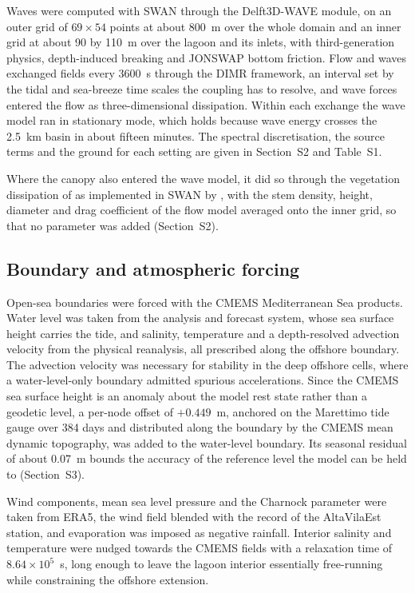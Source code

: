 Waves were computed with SWAN \citep{Booij1999} through the Delft3D-WAVE
module, on an outer grid of $69 \times 54$ points at about 800~m over the whole
domain and an inner grid at about 90 by 110~m over the lagoon and its inlets,
with third-generation physics, depth-induced breaking \citep{BattjesJanssen1978}
and JONSWAP bottom friction. Flow and waves exchanged fields every 3600~s
through the DIMR framework, an interval set by the tidal and sea-breeze time
scales the coupling has to resolve, and wave forces entered the flow as
three-dimensional dissipation. Within each exchange the wave model ran in
stationary mode, which holds because wave energy crosses the 2.5~km basin in
about fifteen minutes. The spectral discretisation, the source terms and the
ground for each setting are given in Section~S2 and Table~S1.

Where the canopy also entered the wave model, it did so through the vegetation
dissipation of \citet{Dalrymple1984} as implemented in SWAN by
\citet{Suzuki2012}, with the stem density, height, diameter and drag coefficient
of the flow model averaged onto the inner grid, so that no parameter was added
(Section~S2).

\subsection{Boundary and atmospheric forcing}
\label{sec:methods_forcing}

Open-sea boundaries were forced with the CMEMS Mediterranean Sea products.
Water level was taken from the analysis and forecast system, whose sea surface
height carries the tide, and salinity, temperature and a depth-resolved
advection velocity from the physical reanalysis, all prescribed along the
offshore boundary. The advection velocity was necessary for stability in the
deep offshore cells, where a water-level-only boundary admitted spurious
accelerations. Since the CMEMS sea surface height is
an anomaly about the model rest state rather than a geodetic level, a per-node
offset of $+0.449$~m, anchored on the Marettimo tide gauge over 384 days and
distributed along the boundary by the CMEMS mean dynamic topography, was added
to the water-level boundary. Its seasonal residual of about 0.07~m bounds the
accuracy of the reference level the model can be held to (Section~S3).

Wind components, mean sea level pressure and the Charnock parameter were taken
from ERA5, the wind field blended with the record of the AltaVilaEst station,
and evaporation was imposed as negative rainfall. Interior salinity and
temperature were nudged towards the CMEMS fields with a relaxation time of
$8.64\times10^{5}$~s, long enough to leave the lagoon interior essentially
free-running while constraining the offshore extension.

